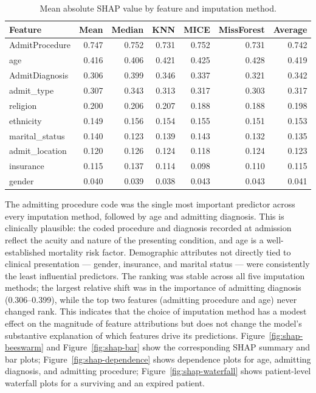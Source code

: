 \documentclass[12pt,a4paper]{report}
\begin{document}
\begin{table}[H]
\centering
\caption{Mean absolute SHAP value by feature and imputation method.}
\label{tab:shap-stability}
\small
\begin{tabular}{lrrrrrr}
\toprule
Feature & Mean & Median & KNN & MICE & MissForest & Average \\
\midrule
AdmitProcedure & 0.747 & 0.752 & 0.731 & 0.752 & 0.731 & 0.742 \\
age & 0.416 & 0.406 & 0.421 & 0.425 & 0.428 & 0.419 \\
AdmitDiagnosis & 0.306 & 0.399 & 0.346 & 0.337 & 0.321 & 0.342 \\
admit\_type & 0.307 & 0.343 & 0.313 & 0.317 & 0.303 & 0.317 \\
religion & 0.200 & 0.206 & 0.207 & 0.188 & 0.188 & 0.198 \\
ethnicity & 0.149 & 0.156 & 0.154 & 0.155 & 0.151 & 0.153 \\
marital\_status & 0.140 & 0.123 & 0.139 & 0.143 & 0.132 & 0.135 \\
admit\_location & 0.120 & 0.126 & 0.124 & 0.118 & 0.124 & 0.123 \\
insurance & 0.115 & 0.137 & 0.114 & 0.098 & 0.110 & 0.115 \\
gender & 0.040 & 0.039 & 0.038 & 0.043 & 0.043 & 0.041 \\
\bottomrule
\end{tabular}
\end{table}


The admitting procedure code was the single most important predictor across every imputation method, followed by age and admitting diagnosis. This is clinically plausible: the coded procedure and diagnosis recorded at admission reflect the acuity and nature of the presenting condition, and age is a well-established mortality risk factor. Demographic attributes not directly tied to clinical presentation --- gender, insurance, and marital status --- were consistently the least influential predictors. The ranking was stable across all five imputation methods; the largest relative shift was in the importance of admitting diagnosis (0.306--0.399), while the top two features (admitting procedure and age) never changed rank. This indicates that the choice of imputation method has a modest effect on the magnitude of feature attributions but does not change the model's substantive explanation of which features drive its predictions. Figure~\ref{fig:shap-beeswarm} and Figure~\ref{fig:shap-bar} show the corresponding SHAP summary and bar plots; Figure~\ref{fig:shap-dependence} shows dependence plots for age, admitting diagnosis, and admitting procedure; Figure~\ref{fig:shap-waterfall} shows patient-level waterfall plots for a surviving and an expired patient.
\end{document}
